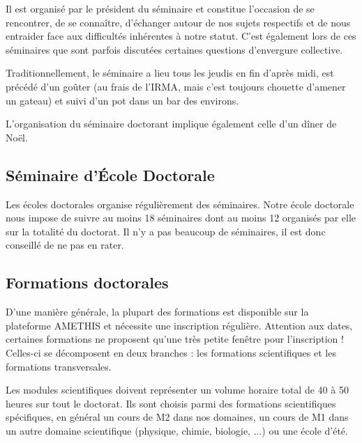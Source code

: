 \documentclass[a5paper]{article}
\begin{document}
\vspace{1em}

Il est organisé par le président du séminaire et constitue l'occasion de se rencontrer, de se connaître, d'échanger autour de nos sujets respectifs et de nous entraider face aux difficultés inhérentes à notre statut. C'est également lors de ces séminaires que sont parfois discutées certaines questions d'envergure collective.

Traditionnellement, le séminaire a lieu tous les jeudis en fin d'après midi, est précédé d'un goûter (au frais de l'IRMA, mais c'est toujours chouette d'amener un gateau) et suivi d'un pot dans un bar des environs.

\vspace{1em}

L'organisation du séminaire doctorant implique également celle d'un dîner de Noël.

\subsection{Séminaire d'École Doctorale}
\label{subsec:semin-decole-doct}

Les écoles doctorales organise régulièrement des séminaires. Notre école doctorale nous impose de suivre au moins 18 séminaires dont au moins 12 organisés par elle sur la totalité du doctorat. Il n'y a pas beaucoup de séminaires, il est donc conseillé de ne pas en rater.

\subsection{Formations doctorales}
\label{subsec:form-doct}

D'une manière générale, la plupart des formations est disponible sur la plateforme AMETHIS et nécessite une inscription régulière. Attention aux dates, certaines formations ne proposent qu'une très petite fenêtre pour l'inscription ! Celles-ci se décomposent en deux branches : les formations scientifiques et les formations transversales.


\medskip

Les modules scientifiques doivent représenter un volume horaire total de 40 à 50 heures sur tout le doctorat. Ils sont choisis parmi des formations scientifiques spécifiques, en général un cours de M2 dans nos domaines, un cours de M1 dans un autre domaine scientifique (physique, chimie, biologie, ...) ou une école d'été.

\medskip
\end{document}
